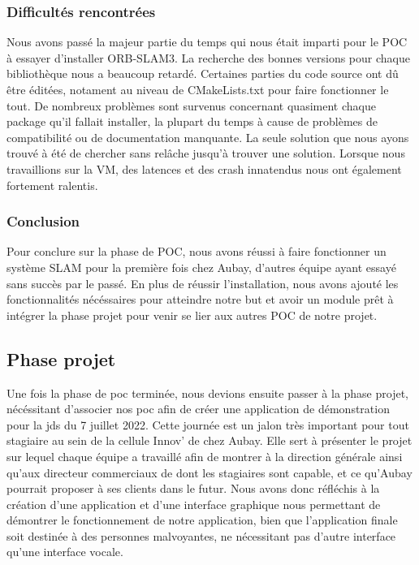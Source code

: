 \documentclass[11pt]{article}
\begin{document}
      \subsubsection{Difficultés rencontrées}
        Nous avons passé la majeur partie du temps qui nous était imparti pour le POC à essayer d'installer ORB-SLAM3. La recherche des bonnes
        versions pour chaque bibliothèque nous a beaucoup retardé. Certaines parties du code source ont dû être éditées, notament au niveau
        de CMakeLists.txt pour faire fonctionner le tout.
        De nombreux problèmes sont survenus concernant quasiment chaque package qu'il fallait installer, la plupart du temps à cause de
        problèmes de compatibilité ou de documentation manquante. La seule solution que nous ayons trouvé à été de chercher sans relâche jusqu'à
        trouver une solution.
        Lorsque nous travaillions sur la VM, des latences et des crash innatendus nous ont également fortement ralentis.       
 
      \subsubsection{Conclusion}
        Pour conclure sur la phase de POC, nous avons réussi à faire fonctionner un système SLAM pour la première fois chez Aubay, d'autres
        équipe ayant essayé sans succès par le passé. En plus de réussir l'installation, nous avons ajouté les fonctionnalités nécéssaires
        pour atteindre notre but et avoir un module prêt à intégrer la phase projet pour venir se lier aux autres POC de notre projet.
    \subsection{Phase projet}
      Une fois la phase de \acrshort{poc} terminée, nous devions ensuite passer à la phase projet, nécéssitant d'associer nos \acrshort{poc}
      afin de créer une application de démonstration pour la \acrshort{jds} du 7 juillet 2022. Cette journée est un jalon très important
      pour tout stagiaire au sein de la cellule Innov' de chez Aubay. Elle sert à présenter le projet sur lequel chaque équipe a travaillé
      afin de montrer à la direction générale ainsi qu'aux directeur commerciaux de dont les stagiaires sont capable, et ce qu'Aubay pourrait
      proposer à ses clients dans le futur. Nous avons donc réfléchis à la création d'une application et d'une
      interface graphique nous permettant de démontrer
      le fonctionnement de notre application, bien que l'application finale soit destinée à des personnes malvoyantes, ne nécessitant pas 
      d'autre interface qu'une interface vocale.
\end{document}

